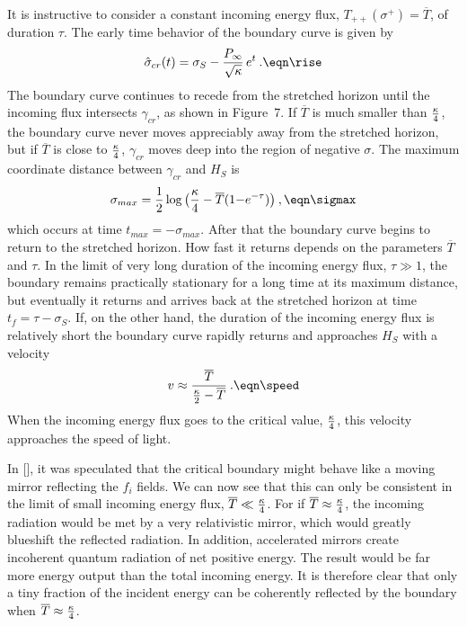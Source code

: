 It is instructive to consider a constant incoming energy flux,
$T_{++}(\sigma^+)={\overline T}$, of duration $\tau$.  The early time
behavior of the boundary curve is given by
$$
\hat\sigma_{cr}(t)
= \sigma_S - {P_\infty\over \sqrt{\kappa}}\,e^t \>.
\eqn\rise
$$
The boundary curve continues to recede from the stretched horizon
until the incoming flux intersects $\gamma_{cr}$, as shown in
Figure~7.  If ${\overline T}$ is much smaller than ${\kappa\over 4}$,
the boundary curve never moves appreciably away from the stretched
horizon, but if ${\overline T}$ is close to ${\kappa\over 4}$,
$\gamma_{cr}$ moves deep into the region of negative $\sigma$.  The
maximum coordinate distance between $\gamma_{cr}$ and $H_S$ is
$$
\sigma_{max} = \half \log{\bigl(
{\kappa\over 4}-{\overline T}(1{-}e^{-\tau})
\bigr)} \>,
\eqn\sigmax
$$
which occurs at time $t_{max}=-\sigma_{max}$.  After that the
boundary curve begins to return to the stretched horizon.  How fast
it returns depends on the parameters ${\overline T}$ and $\tau$.  In
the limit of very long duration of the incoming energy flux, $\tau
\gg 1$, the boundary remains practically stationary for a long time
at its maximum distance, but eventually it returns and arrives back
at the stretched horizon at time $t_f=\tau-\sigma_S$.  If, on the
other hand, the duration of the incoming energy flux is relatively
short the boundary curve rapidly returns and approaches $H_S$ with a
velocity
$$
v\approx {{\overline T}\over {\kappa\over 2}-{\overline T}} \>.
\eqn\speed
$$
When the incoming energy flux goes to the critical value,
${\kappa\over 4}$, this velocity approaches the speed of light.

In [\RSTthree], it was speculated that the critical boundary might
behave like a moving mirror reflecting the $f_i$ fields.  We can now
see that this can only be consistent in the limit of small incoming
energy flux, ${\overline T} \ll {\kappa\over 4}$.  For if ${\overline
T} \approx {\kappa\over 4}$, the incoming radiation would be met by a
very relativistic mirror, which would greatly blueshift the reflected
radiation.  In addition, accelerated mirrors create incoherent
quantum radiation of net positive energy.  The result would be far
more energy output than the total incoming energy.  It is therefore
clear that only a tiny fraction of the incident energy can be
coherently reflected by the boundary when ${\overline T} \approx
{\kappa\over 4}$.

